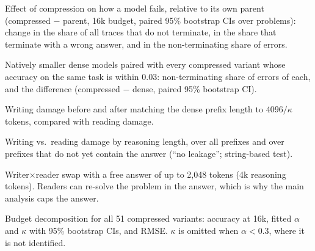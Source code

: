 \documentclass[10pt]{article}
\begin{document}
\begin{table}[t]
  \centering\scriptsize\setlength{\tabcolsep}{3pt}
  \caption{Effect of compression on how a model fails, relative to its own parent (compressed $-$ parent, 16k budget, paired 95\% bootstrap CIs over problems): change in the share of all traces that do not terminate, in the share that terminate with a wrong answer, and in the non-terminating share of errors.}
  \label{tab:failurepaired}
\end{table}

\begin{table}[t]
  \centering\scriptsize\setlength{\tabcolsep}{3pt}
  \caption{Natively smaller dense models paired with every compressed variant whose accuracy on the same task is within 0.03: non-terminating share of errors of each, and the difference (compressed $-$ dense, paired 95\% bootstrap CI).}
  \label{tab:matched}
\end{table}

\begin{table}[t]
  \centering\scriptsize\setlength{\tabcolsep}{3pt}
  \caption{Writing damage before and after matching the dense prefix length to $4096/\kappa$ tokens, compared with reading damage.}
  \label{tab:dilation}
\end{table}

\begin{table}[t]
  \centering\scriptsize\setlength{\tabcolsep}{3pt}
  \caption{Writing vs.\ reading damage by reasoning length, over all prefixes and over prefixes that do not yet contain the answer (``no leakage''; string-based test).}
  \label{tab:leak}
\end{table}

\begin{table}[t]
  \centering\scriptsize\setlength{\tabcolsep}{3pt}
  \caption{Writer$\times$reader swap with a free answer of up to 2,048 tokens (4k reasoning tokens). Readers can re-solve the problem in the answer, which is why the main analysis caps the answer.}
  \label{tab:swapfree}
\end{table}

\begin{table}[t]
  \centering\scriptsize\setlength{\tabcolsep}{3pt}
  \caption{Budget decomposition for all 51 compressed variants: accuracy at 16k, fitted $\alpha$ and $\kappa$ with 95\% bootstrap CIs, and RMSE. $\kappa$ is omitted when $\alpha<0.3$, where it is not identified.}
  \label{tab:alphafull}
\end{table}
\end{document}
